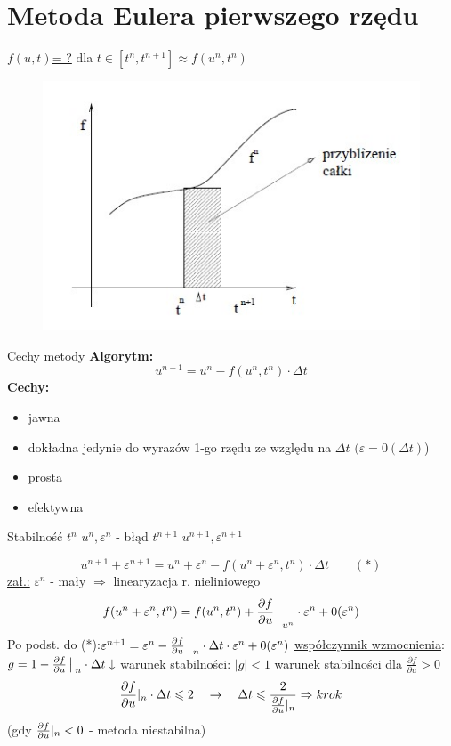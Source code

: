 \section{Metoda Eulera pierwszego rzędu}
\begin{frame}
  \underline{$f(u,t)$= ?} \quad dla  \quad $t \in [t^n,t^{n+1}] \approx f(u^n,t^n)$
  \begin{figure}
	\includegraphics[height=0.65\textheight]{img/22/img1.jpg}
	\end{figure}
\end{frame}
\begin{frame}{Cechy metody}
  \textbf{Algorytm:}
  $$u^{n+1} = u^n - f(u^n, t^n) \cdot \Delta t$$
  \textbf{Cechy:}
  \begin{itemize}
    \item jawna
    \item dokładna jedynie do wyrazów 1-go rzędu ze względu na $\Delta t$ \quad $(\varepsilon=0(\Delta t)$)
    \item prosta
    \item efektywna
  \end{itemize}
\end{frame}
\begin{frame}{Stabilność}
  $t^n$ \quad $u^n, \varepsilon^n$ - błąd \qquad
  $t^{n+1}$ \quad $u^{n+1}, \varepsilon^{n+1}$ 

  $$u^{n+1} + \varepsilon^{n+1} = u^n+\varepsilon^n-f(u^n+\varepsilon^n,t^n)\cdot \Delta t \qquad(*)$$
  \underline{zał.:} $\varepsilon^n$ - mały $\Rightarrow$ linearyzacja r. nieliniowego
  $$f(u^n+\varepsilon^n,t^n) = f(u^n,t^n)+\frac{\partial f}{\partial u}{\bigg\arrowvert}_{u^n} \cdot \varepsilon^n+0(\varepsilon^n)$$
  Po podst. do (*):\qquad $\varepsilon^{n+1} = \varepsilon^n-\frac{\partial f}{\partial u}\big\arrowvert_n \cdot \Delta t \cdot \varepsilon^n +0(\varepsilon^n)$ \newline
  \underline{współczynnik wzmocnienia}:\qquad $g = 1- \frac{\partial f}{\partial u}{\big\arrowvert}_n \cdot \Delta t\downarrow$
  warunek stabilności: $|g|<1$ warunek stabilności dla $\frac{\partial f}{\partial u}>0$
  $$\frac{\partial f}{\partial u}\arrowvert_n \cdot \Delta t \leqslant 2 \quad 
  \rightarrow \quad \Delta t \leqslant \frac{2}{\frac{\partial f}{\partial u}\arrowvert_n} \Rightarrow krok$$
  (gdy $\frac{\partial f}{\partial u}\arrowvert_n < 0$ - metoda niestabilna)
\end{frame}
